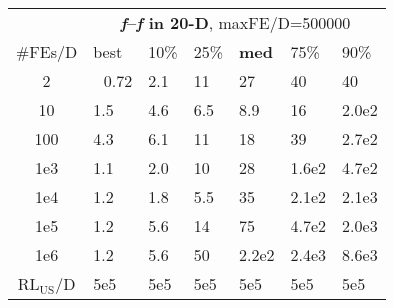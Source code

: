 \begin{tabular}{c|llllll}
 & \multicolumn{6}{|c}{\textbf{\textit{f}\raisebox{-0.35ex}{1}--\textit{f}\raisebox{-0.35ex}{24} in 20-D}, maxFE/D=500000}\\
\#FEs/D & best & 10\% & 25\% & \textbf{med} & 75\% & 90\%\\
2 & ~\,0.72 & \hspace*{1ex}2.1 & 11 & 27 & 40 & 40\\
10 & \hspace*{1ex}1.5 & \hspace*{1ex}4.6 & \hspace*{1ex}6.5 & \hspace*{1ex}8.9 & 16 & 2.0e2\\
100 & \hspace*{1ex}4.3 & \hspace*{1ex}6.1 & 11 & 18 & 39 & 2.7e2\\
1e3 & \hspace*{1ex}1.1 & \hspace*{1ex}2.0 & 10 & 28 & 1.6e2 & 4.7e2\\
1e4 & \hspace*{1ex}1.2 & \hspace*{1ex}1.8 & \hspace*{1ex}5.5 & 35 & 2.1e2 & 2.1e3\\
1e5 & \hspace*{1ex}1.2 & \hspace*{1ex}5.6 & 14 & 75 & 4.7e2 & 2.0e3\\
1e6 & \hspace*{1ex}1.2 & \hspace*{1ex}5.6 & 50 & 2.2e2 & 2.4e3 & 8.6e3\\
$\text{RL}_{\text{US}}$/D & 5e5 & 5e5 & 5e5 & 5e5 & 5e5 & 5e5
\end{tabular}
